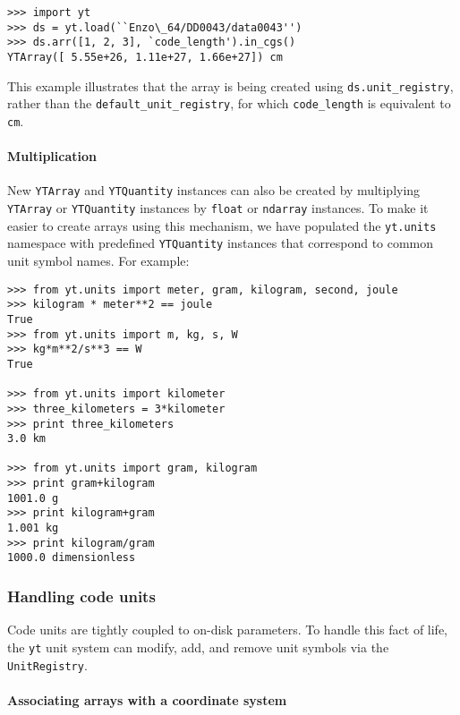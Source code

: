 \begin{Verbatim}
>>> import yt
>>> ds = yt.load(``Enzo\_64/DD0043/data0043'')
>>> ds.arr([1, 2, 3], `code_length').in_cgs() 
YTArray([ 5.55e+26, 1.11e+27, 1.66e+27]) cm
\end{Verbatim}

This example illustrates that the array is being created using
\texttt{ds.unit\_registry}, rather than the
\texttt{default\_unit\_registry}, for which \texttt{code\_length} is
equivalent to \texttt{cm}.

\paragraph{Multiplication}\label{multiplication}

New \texttt{YTArray} and \texttt{YTQuantity} instances can also be created by
multiplying \texttt{YTArray} or \texttt{YTQuantity} instances by \texttt{float}
or \texttt{ndarray} instances. To make it easier to create arrays using this
mechanism, we have populated the \texttt{yt.units} namespace with predefined
\texttt{YTQuantity} instances that correspond to common unit symbol names. For
example:

\begin{Verbatim}
>>> from yt.units import meter, gram, kilogram, second, joule 
>>> kilogram * meter**2 == joule 
True
>>> from yt.units import m, kg, s, W 
>>> kg*m**2/s**3 == W
True

>>> from yt.units import kilometer 
>>> three_kilometers = 3*kilometer 
>>> print three_kilometers 
3.0 km

>>> from yt.units import gram, kilogram 
>>> print gram+kilogram 
1001.0 g 
>>> print kilogram+gram 
1.001 kg 
>>> print kilogram/gram 
1000.0 dimensionless
\end{Verbatim}

\subsubsection{Handling code units}\label{handling-code-units}


Code units are tightly coupled to on-disk parameters. To handle this
fact of life, the \texttt{yt} unit system can modify, add, and remove
unit symbols via the \texttt{UnitRegistry}.

\paragraph{Associating arrays with a coordinate
system}\label{associating-arrays-with-a-coordinate-system}


